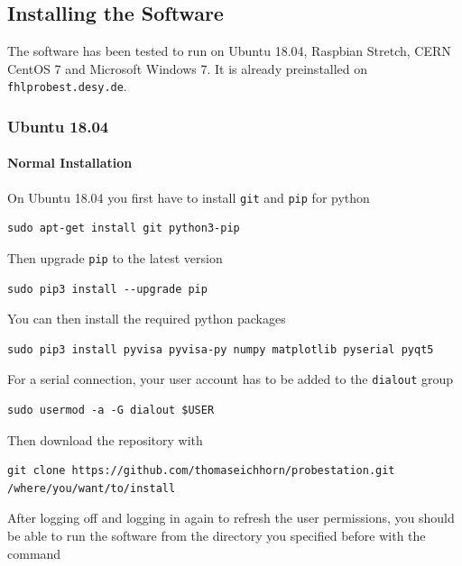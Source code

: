 \documentclass[a4paper]{article}
\begin{document}
\subsection{Installing the Software}
\label{sec:installation}

The software has been tested to run on Ubuntu 18.04, Raspbian Stretch, CERN CentOS 7 and Microsoft Windows 7.
It is already preinstalled on {\tt fhlprobest.desy.de}.

\subsubsection{Ubuntu 18.04}

\paragraph{Normal Installation\\}
On Ubuntu 18.04 you first have to install {\tt git} and {\tt pip} for python

\medskip
\begin{lstlisting}
sudo apt-get install git python3-pip
\end{lstlisting}
\medskip

Then upgrade {\tt pip} to the latest version

\medskip
\begin{lstlisting}
sudo pip3 install --upgrade pip
\end{lstlisting}
\medskip

You can then install the required python packages

\medskip
\begin{lstlisting}
sudo pip3 install pyvisa pyvisa-py numpy matplotlib pyserial pyqt5
\end{lstlisting}
\medskip

For a serial connection, your user account has to be added to the {\tt dialout} group

\medskip
\begin{lstlisting}
sudo usermod -a -G dialout $USER
\end{lstlisting}
\medskip

Then download the repository with

\medskip
\begin{lstlisting}
git clone https://github.com/thomaseichhorn/probestation.git /where/you/want/to/install
\end{lstlisting}
\medskip

After logging off and logging in again to refresh the user permissions, you should be able to run the software from the directory you specified before with the command
\end{document}
